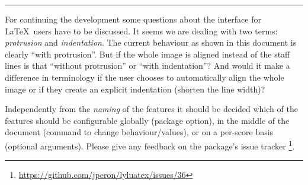 \documentclass[DIV=12]{scrartcl}
\begin{document}
\hrule

\bigskip
For continuing the development some questions about the interface for \LaTeX\ users have to be discussed. It seems we are dealing with two terms: \emph{protrusion} and \emph{indentation}.  The current behaviour as shown in this document is clearly “with protrusion”.  But if the whole image is aligned instead of the staff lines is that “without protrusion” or “with indentation”? And would it make a difference in terminology if the user chooses to automatically align the whole image or if they create an explicit indentation (shorten the line width)?

Independently from the \emph{naming} of the features it should be decided which of the features should be configurable globally (package option), in the middle of the document (command to change behaviour/values), or on a per-score basis (optional arguments). Please give any feedback on the package's issue tracker%
\footnote{\url{https://github.com/jperon/lyluatex/issues/36}}.
\end{document}
